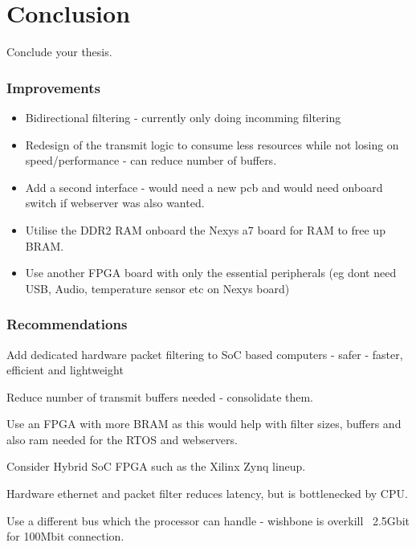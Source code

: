 \chapter[Conclusion]{Conclusion}
\label{Chap:Conclusion}

Conclude your thesis.



\subsection{Improvements}

\begin{itemize}
    \item Bidirectional filtering - currently only doing incomming filtering
    \item Redesign of the transmit logic to consume less resources while not losing on speed/performance - can reduce number of buffers. 
    \item Add a second interface - would need a new pcb and would need onboard switch if webserver was also wanted.
    \item Utilise the DDR2 RAM onboard the Nexys a7 board for RAM to free up BRAM. 
    \item Use another FPGA board with only the essential peripherals (eg dont need USB, Audio, temperature sensor etc on Nexys board)
\end{itemize}


\subsection{Recommendations}

Add dedicated hardware packet filtering to SoC based computers - safer - faster, efficient and lightweight

Reduce number of transmit buffers needed - consolidate them.

Use an FPGA with more BRAM as this would help with filter sizes, buffers and also ram needed for the RTOS and webservers.

Consider Hybrid SoC FPGA such as the Xilinx Zynq lineup.

Hardware ethernet and packet filter reduces latency, but is bottlenecked by CPU.

Use a different bus which the processor can handle - wishbone is overkill ~2.5Gbit for 100Mbit connection.

